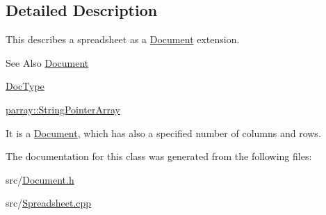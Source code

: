 \subsection{Detailed Description}
This describes a spreadsheet as a \hyperlink{classdocs_1_1Document}{Document} extension. 

\begin{DoxySeeAlso}{See Also}
\hyperlink{classdocs_1_1Document}{Document} 

\hyperlink{classdocs_1_1DocType}{Doc\-Type} 

\hyperlink{classparray_1_1StringPointerArray}{parray\-::\-String\-Pointer\-Array}
\end{DoxySeeAlso}
It is a \hyperlink{classdocs_1_1Document}{Document}, which has also a specified number of columns and rows. 

The documentation for this class was generated from the following files\-:\begin{DoxyCompactItemize}
\item 
src/\hyperlink{Document_8h}{Document.\-h}\item 
src/\hyperlink{Spreadsheet_8cpp}{Spreadsheet.\-cpp}\end{DoxyCompactItemize}
